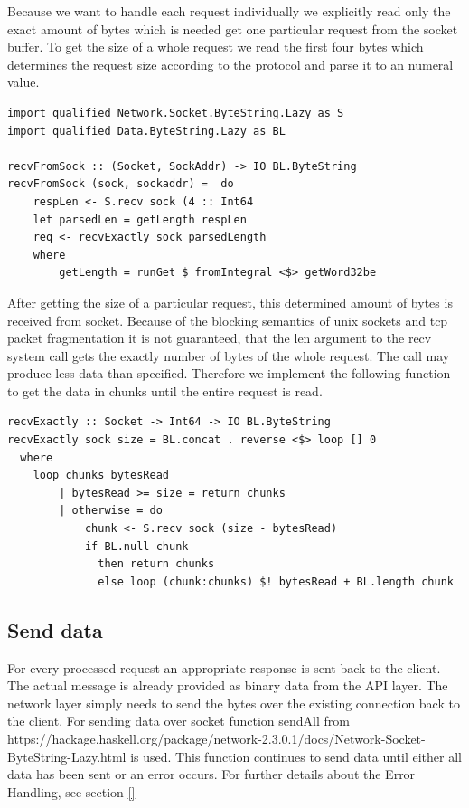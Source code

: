 Because we want to handle each request individually we explicitly read
only the exact amount of bytes which is needed get one particular request from
the socket buffer. To get the size of a whole request we read the first four
bytes which determines the request size according to the protocol and parse it
to an numeral value.

\begin{lstlisting}
import qualified Network.Socket.ByteString.Lazy as S 
import qualified Data.ByteString.Lazy as BL

recvFromSock :: (Socket, SockAddr) -> IO BL.ByteString
recvFromSock (sock, sockaddr) =  do 
    respLen <- S.recv sock (4 :: Int64
    let parsedLen = getLength respLen
    req <- recvExactly sock parsedLength 
    where
        getLength = runGet $ fromIntegral <$> getWord32be
\end{lstlisting}

After getting the size of a particular request, this determined amount of bytes
is received from socket. Because of the blocking semantics of unix sockets and
tcp packet fragmentation it is not guaranteed, that the len argument to the recv
system call gets the exactly number of bytes of the whole request. The call may produce
less data than specified. Therefore we implement the following function to get
the data in
chunks until the entire request is read. 

\begin{lstlisting}
recvExactly :: Socket -> Int64 -> IO BL.ByteString 
recvExactly sock size = BL.concat . reverse <$> loop [] 0 
  where
    loop chunks bytesRead
        | bytesRead >= size = return chunks
        | otherwise = do  
            chunk <- S.recv sock (size - bytesRead)
            if BL.null chunk 
              then return chunks 
              else loop (chunk:chunks) $! bytesRead + BL.length chunk 
\end{lstlisting}

\subsection{Send data}
\label{sec:impl-broker-socket-send}
For every processed request an appropriate response is sent back to the client.
The actual message is already provided as binary data from the API layer. The
network layer simply needs to send the bytes over the existing connection back
to the client. For sending data over socket function sendAll from 
{https://hackage.haskell.org/package/network-2.3.0.1/docs/Network-Socket-ByteString-Lazy.html}
is used. This function continues to send data until either all
data has been sent or an error occurs. For further details about the Error Handling, see section \ref{}


